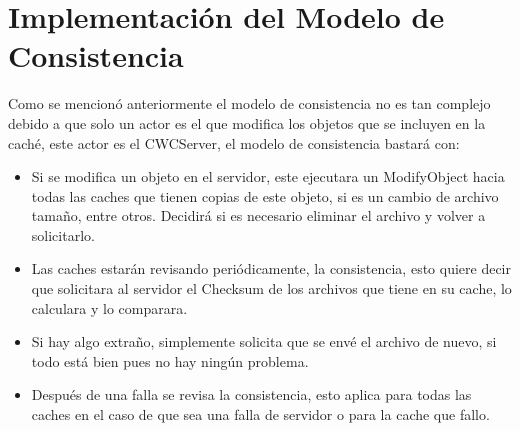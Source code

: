 \section{Implementación del Modelo de Consistencia}
Como se mencionó anteriormente el modelo de consistencia no es tan complejo debido a que solo un actor es el que modifica los objetos que se incluyen en la caché, este actor es el CWCServer, el modelo de consistencia bastará con:

\begin{itemize}
\item Si se modifica un objeto en el servidor, este ejecutara un ModifyObject hacia todas las caches que tienen copias de este objeto, si es un cambio de archivo tamaño, entre otros. Decidirá si es necesario eliminar el archivo y volver a solicitarlo.
\item Las caches estarán revisando periódicamente, la consistencia, esto quiere decir que solicitara al servidor el Checksum de los archivos que tiene en su cache, lo calculara y lo comparara.
\item Si hay algo extraño, simplemente solicita que se envé el archivo de nuevo, si todo está bien pues no hay ningún problema.
\item Después de una falla se revisa la consistencia, esto aplica para todas las caches en el caso de que sea una falla de servidor o para la cache que fallo.
\end{itemize}